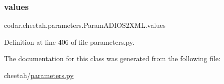 \subsubsection{\texorpdfstring{values}{values}}
{\footnotesize\ttfamily codar.\+cheetah.\+parameters.\+Param\+A\+D\+I\+O\+S2\+X\+M\+L.\+values}



Definition at line 406 of file parameters.\+py.



The documentation for this class was generated from the following file\+:\begin{DoxyCompactItemize}
\item 
cheetah/\hyperlink{parameters_8py}{parameters.\+py}\end{DoxyCompactItemize}

